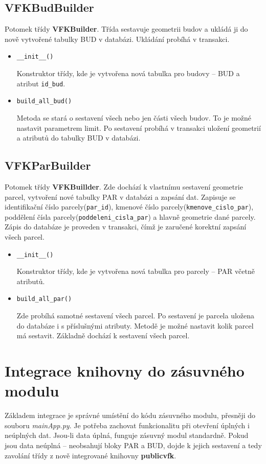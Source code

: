 \subsection{VFKBudBuilder}
Potomek třídy \textbf{VFKBuilder}. Třída sestavuje geometrii budov a
ukládá ji do nově vytvořené tabulky BUD v databázi. Ukládání probíhá v
transakci.
\begin{itemize}[leftmargin=50pt]
\item \verb|__init__()|

Konstruktor třídy, kde je vytvořena nová tabulka pro budovy -- BUD a
atribut \verb|id_bud|.
\item \verb|build_all_bud()|

Metoda se stará o sestavení všech nebo jen části všech budov. To je
možné nastavit parametrem limit. Po sestavení probíhá v transakci
uložení geometrií a atributů do tabulky BUD v databázi.
\end{itemize}
\subsection{VFKParBuilder}
Potomek třídy \textbf{VFKBuillder}. Zde dochází k vlastnímu sestavení
geometrie parcel, vytvoření nové tabulky PAR v databázi a zapsání
dat. Zapisuje se identifikační číslo parcely(\verb|par_id|), kmenové
číslo parcely(\verb|kmenove_cislo_par|), poddělení čísla
parcely(\verb|poddeleni_cisla_par|) a hlavně geometrie dané
parcely. Zápis do databáze je proveden v transakci, čímž je zaručené
korektní zapsání všech parcel.

\begin{itemize}[leftmargin=50pt]
\item \verb|__init__()|

Konstruktor třídy, kde je vytvořena nová tabulka pro parcely -- PAR včetně atributů.
\item \verb|build_all_par()|

Zde probíhá samotné sestavení všech parcel. Po sestavení je parcela
uložena do databáze i s příslušnými atributy. Metodě je možné nastavit
kolik parcel má sestavit. Základně dochází k sestavení všech parcel.

\end{itemize}
\section{Integrace knihovny do zásuvného modulu}
\label{sec:integrace_knihovny}
Základem integrace je správné umístění do kódu zásuvného modulu,
přesněji do souboru \textit{mainApp.py}. Je potřeba zachovat
funkcionalitu při otevření úplných i neúplných dat. Jsou-li data
úplná, funguje zásuvný modul standardně. Pokud jsou data neúplná --
neobsahují bloky PAR a BUD, dojde k jejich sestavení a tedy zavolání
třídy z nově integrované knihovny \textbf{publicvfk}.

